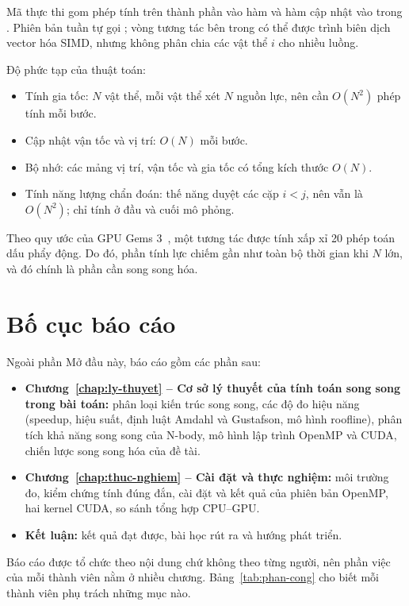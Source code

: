 Mã thực thi gom phép tính trên thành phần vào hàm  và hàm cập nhật vào  trong . Phiên bản tuần tự gọi ; vòng tương tác bên trong có thể được trình biên dịch vector hóa SIMD, nhưng không phân chia các vật thể $i$ cho nhiều luồng.

Độ phức tạp của thuật toán:
\begin{itemize}
\item Tính gia tốc: $N$ vật thể, mỗi vật thể xét $N$ nguồn lực, nên cần $O(N^2)$ phép tính mỗi bước.
\item Cập nhật vận tốc và vị trí: $O(N)$ mỗi bước.
\item Bộ nhớ: các mảng vị trí, vận tốc và gia tốc có tổng kích thước $O(N)$.
\item Tính năng lượng chẩn đoán: thế năng duyệt các cặp $i<j$, nên vẫn là $O(N^2)$; chỉ tính ở đầu và cuối mô phỏng.
\end{itemize}
Theo quy ước của GPU Gems 3~\cite{gpugems3}, một tương tác được tính xấp xỉ 20 phép toán dấu phẩy động. Do đó, phần tính lực chiếm gần như toàn bộ thời gian khi $N$ lớn, và đó chính là phần cần song song hóa.

\section{Bố cục báo cáo}

Ngoài phần Mở đầu này, báo cáo gồm các phần sau:
\begin{itemize}
\item \textbf{Chương~\ref{chap:ly-thuyet} -- Cơ sở lý thuyết của tính toán song song trong bài toán:} phân loại kiến trúc song song, các độ đo hiệu năng (speedup, hiệu suất, định luật Amdahl và Gustafson, mô hình roofline), phân tích khả năng song song của N-body, mô hình lập trình OpenMP và CUDA, chiến lược song song hóa của đề tài.
\item \textbf{Chương~\ref{chap:thuc-nghiem} -- Cài đặt và thực nghiệm:} môi trường đo, kiểm chứng tính đúng đắn, cài đặt và kết quả của phiên bản OpenMP, hai kernel CUDA, so sánh tổng hợp CPU--GPU.
\item \textbf{Kết luận:} kết quả đạt được, bài học rút ra và hướng phát triển.
\end{itemize}

Báo cáo được tổ chức theo nội dung chứ không theo từng người, nên phần việc của mỗi thành viên nằm ở nhiều chương. Bảng~\ref{tab:phan-cong} cho biết mỗi thành viên phụ trách những mục nào.

